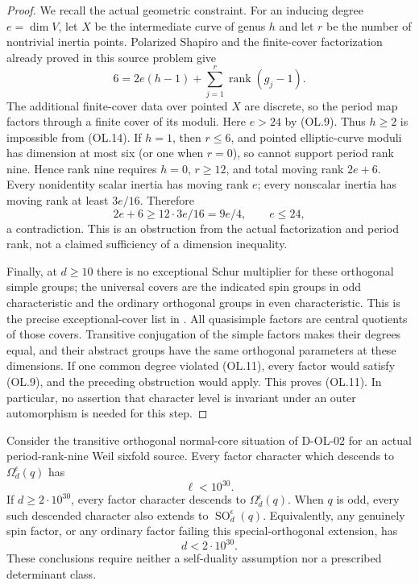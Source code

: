 \begin{proof}
We recall the actual geometric constraint. For an inducing
degree $e=\dim V$, let $X$ be the intermediate curve of genus
$h$ and let $r$ be the number of nontrivial inertia points.
Polarized Shapiro and the finite-cover factorization already
proved in this source problem give
\[
 6=2e(h-1)+\sum_{j=1}^r\operatorname{rank}(g_j-1).
                                                               \tag{OL.14}
\]
The additional finite-cover data over pointed $X$ are discrete,
so the period map factors through a finite cover of its moduli.
Here $e>24$ by (OL.9). Thus $h\ge2$ is impossible from
(OL.14). If $h=1$, then $r\le6$, and pointed elliptic-curve
moduli has dimension at most six (or one when $r=0$), so cannot
support period rank nine. Hence rank nine requires $h=0$,
$r\ge12$, and total moving rank $2e+6$.
Every nonidentity scalar inertia has moving rank $e$; every
nonscalar inertia has moving rank at least $3e/16$. Therefore
\[
                   2e+6\ge12\cdot3e/16=9e/4,
                   \qquad e\le24,
                                                               \tag{OL.15}
\]
a contradiction. This is an obstruction from the actual
factorization and period rank, not a claimed sufficiency of a
dimension inequality.

Finally, at $d\ge10$ there is no exceptional Schur multiplier
for these orthogonal simple groups; the universal covers are
the indicated spin groups in odd characteristic and the
ordinary orthogonal groups in even characteristic. This is
the precise exceptional-cover list in
\cite[Chapter~5, Table~1, p.~35; ordinary-cover discussion,
p.~4]{BI:HHM}. All quasisimple factors are central quotients
of those covers. Transitive conjugation of the simple factors
makes their degrees equal, and their abstract groups have the
same orthogonal parameters at these dimensions. If one common
degree violated (OL.11), every factor would satisfy (OL.9),
and the preceding obstruction would apply. This proves
(OL.11). In particular, no assertion that character level is
invariant under an outer automorphism is needed for this step.
\end{proof}

\begin{theorem}
\label{D-OL-03}
Consider the transitive orthogonal normal-core situation of
D-OL-02 for an actual period-rank-nine Weil sixfold source.
Every factor character which descends to
$\Omega_d^\epsilon(q)$ has
\[
                                  \ell<10^{30}.
                                                               \tag{OL.16}
\]
If $d\ge2\cdot10^{30}$, every factor character descends to
$\Omega_d^\epsilon(q)$. When $q$ is odd, every such descended
character also extends to $\operatorname{SO}_d^\epsilon(q)$.
Equivalently, any genuinely spin factor, or any ordinary factor
failing this special-orthogonal extension, has
\[
                                  d<2\cdot10^{30}.
                                                               \tag{OL.17}
\]
These conclusions require neither a self-duality assumption
nor a prescribed determinant class.
\end{theorem}

